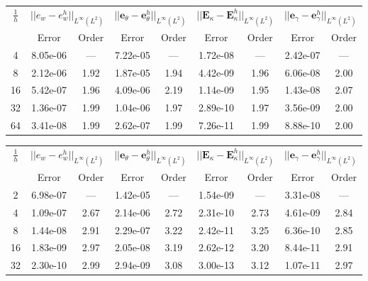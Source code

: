 \begin{table}[p]
	\centering
	\begin{tabular}{ccccccccc}
		\hline 
		\multirow{2}{*}{$\frac{1}{h}$} & \multicolumn{2}{c}{$||e_w - e_w^h||_{L^{\infty}(L^2)}$}    & \multicolumn{2}{c}{$||\bm{e}_\theta - \bm{e}_\theta^h||_{L^{\infty}(L^2)}$} & \multicolumn{2}{c}{$||\bm{E}_\kappa - \bm{E}_\kappa^h||_{L^{\infty}(L^2)}$} & \multicolumn{2}{c}{$||\bm{e}_\gamma - \bm{e}_\gamma^ h||_{L^{\infty}(L^2)}$}   \\ 
		& Error & Order  & Error & Order  & Error & Order  & Error & Order   \\ 
		\hline 
		4  & 8.05e-06 & ---  & 7.22e-05 & ---  & 1.72e-08 & ---  & 2.42e-07 & --- \\ 
		8  & 2.12e-06 & 1.92 & 1.87e-05 & 1.94 & 4.42e-09 & 1.96 & 6.06e-08 & 2.00\\ 
		16 & 5.42e-07 & 1.96 & 4.09e-06 & 2.19 & 1.14e-09 & 1.95 & 1.43e-08 & 2.07\\ 
		32 & 1.36e-07 & 1.99 & 1.04e-06 & 1.97 & 2.89e-10 & 1.97 & 3.56e-09 & 2.00\\ 
		64 & 3.41e-08 & 1.99 & 2.62e-07 & 1.99 & 7.26e-11 & 1.99 & 8.88e-10 & 2.00\\ 
		\hline 
	\end{tabular} 
	\captionsetup{width=0.95\linewidth}
	\vspace{1mm}
	\label{tab:resminBTJ_k2}
\end{table}

\begin{table}[p]
	\centering
	\begin{tabular}{ccccccccc}
		\hline 
		\multirow{2}{*}{$\frac{1}{h}$} & \multicolumn{2}{c}{$||e_w - e_w^h||_{L^{\infty}(L^2)}$}    & \multicolumn{2}{c}{$||\bm{e}_\theta - \bm{e}_\theta^h||_{L^{\infty}(L^2)}$} & \multicolumn{2}{c}{$||\bm{E}_\kappa - \bm{E}_\kappa^h||_{L^{\infty}(L^2)}$} & \multicolumn{2}{c}{$||\bm{e}_\gamma - \bm{e}_\gamma^ h||_{L^{\infty}(L^2)}$}   \\ 
		& Error & Order  & Error & Order  & Error & Order  & Error & Order   \\ 
		\hline 
		2  & 6.98e-07 & ---  & 1.42e-05 & ---  & 1.54e-09 & ---  & 3.31e-08 & --- \\ 
		4  & 1.09e-07 & 2.67 & 2.14e-06 & 2.72 & 2.31e-10 & 2.73 & 4.61e-09 & 2.84\\ 
		8  & 1.44e-08 & 2.91 & 2.29e-07 & 3.22 & 2.42e-11 & 3.25 & 6.36e-10 & 2.85\\ 
		16 & 1.83e-09 & 2.97 & 2.05e-08 & 3.19 & 2.62e-12 & 3.20 & 8.44e-11 & 2.91\\ 
		32 & 2.30e-10 & 2.99 & 2.94e-09 & 3.08 & 3.00e-13 & 3.12 & 1.07e-11 & 2.97\\ 
		\hline 
	\end{tabular} 
	\captionsetup{width=0.95\linewidth}
	\vspace{1mm}
	\label{tab:resminBTJ_k3}
\end{table}

